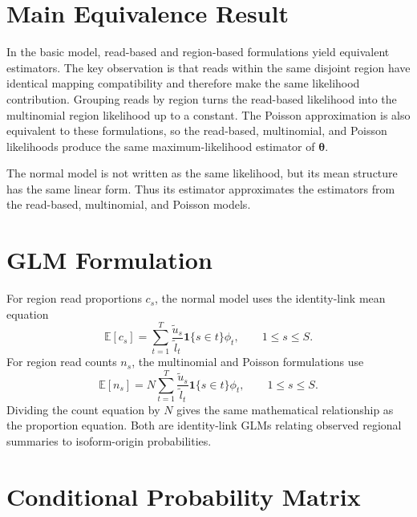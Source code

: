\documentclass[11pt]{article}
\begin{document}
\section*{Main Equivalence Result}

In the basic model, read-based and region-based formulations yield equivalent
estimators. The key observation is that reads within the same disjoint region
have identical mapping compatibility and therefore make the same likelihood
contribution. Grouping reads by region turns the read-based likelihood into the
multinomial region likelihood up to a constant. The Poisson approximation is
also equivalent to these formulations, so the read-based, multinomial, and
Poisson likelihoods produce the same maximum-likelihood estimator of
\(\boldsymbol{\theta}\).

The normal model is not written as the same likelihood, but its mean structure
has the same linear form. Thus its estimator approximates the estimators from
the read-based, multinomial, and Poisson models.

\section*{GLM Formulation}

For region read proportions \(c_s\), the normal model uses the identity-link
mean equation
\[
  \mathbb{E}[c_s]
  =
  \sum_{t=1}^T
  \frac{\tilde{u}_s}{\tilde{l}_t}
  \mathbf{1}\{s \in t\}
  \phi_t,
  \qquad 1 \le s \le S.
\]
For region read counts \(n_s\), the multinomial and Poisson formulations use
\[
  \mathbb{E}[n_s]
  =
  N
  \sum_{t=1}^T
  \frac{\tilde{u}_s}{\tilde{l}_t}
  \mathbf{1}\{s \in t\}
  \phi_t,
  \qquad 1 \le s \le S.
\]
Dividing the count equation by \(N\) gives the same mathematical relationship
as the proportion equation. Both are identity-link GLMs relating observed
regional summaries to isoform-origin probabilities.

\section*{Conditional Probability Matrix}
\end{document}
